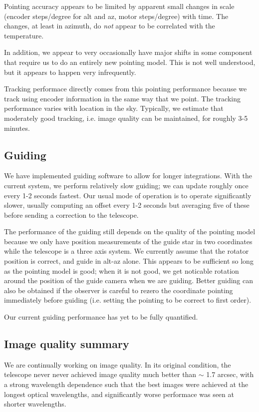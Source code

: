 \documentclass{article}[12pt]
\begin{document}
Pointing accuracy appears to be limited by apparent small changes in
scale (encoder steps/degree for alt and az, motor steps/degree) with
time. The changes, at least in azimuth, do \textit{not} appear to
be correlated with the temperature.

In addition, we appear to very occasionally have major shifts in some
component that require us to do an entirely new pointing model. This
is not well understood, but it appears to happen very infrequently.

Tracking performace directly comes from this pointing performance because
we track using encoder information in the same way that we point.  The
tracking performance varies with location in the sky. Typically, we
estimate that moderately good tracking, i.e. image quality can be maintained,
for roughly 3-5 minutes.

\subsection{Guiding}

We have implemented guiding software to allow for longer integrations.
With the current system, we perform relatively slow guiding; we can
update roughly once every 1-2 seconds fastest. Our usual mode of operation
is to operate significantly slower, usually computing an offset every
1-2 seconds but averaging five of these before sending a correction to
the telescope.

The performance of the guiding still depends on the quality of the
pointing model because we only have position measurements of the guide
star in two coordinates while the telescope is a three axis system.
We currently assume that the rotator position is correct, and guide
in alt-az alone. This appears to be sufficient so long as the pointing
model is good; when it is not good, we get noticable rotation around the
position of the guide camera when we are guiding. Better guiding can
also be obtained if the observer is careful to rezero the coordinate
pointing immediately before guiding (i.e. setting the pointing to be
correct to first order).

Our current guiding performance has yet to be fully quantified.

\subsection{Image quality summary}

We are continually working on image quality. In its original condition,
the telescope never never achieved image quality much better than $\sim$ 1.7 arcsec,
with a strong wavelength dependence such that the best images were achieved
at the longest optical wavelengths, and significantly worse performace was seen
at shorter wavelengths.
\end{document}
